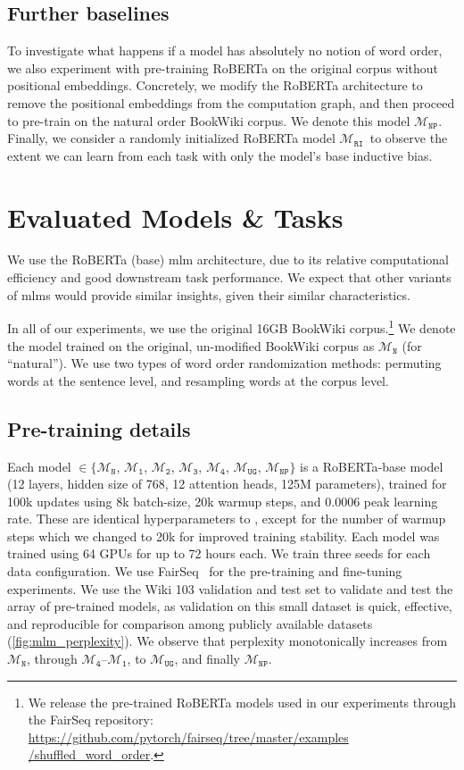 \documentclass[letterpaper, 12pt]{report}
\newcommand{\OR}{$\mathcal{M}_{\texttt{N}}$}
\newcommand{\RI}{$\mathcal{M}_{\texttt{1}}$}
\newcommand{\RII}{$\mathcal{M}_{\texttt{2}}$}
\newcommand{\RIII}{$\mathcal{M}_{\texttt{3}}$}
\newcommand{\RIV}{$\mathcal{M}_{\texttt{4}}$}
\newcommand{\RC}{$\mathcal{M}_{\texttt{UG}}$}
\newcommand{\RT}{$\mathcal{M}_{\texttt{RI}}$}
\newcommand{\NP}{$\mathcal{M}_{\texttt{NP}}$}
\begin{document}
\subsection{Further baselines}

To investigate what happens if a model has absolutely no notion of word order, we also experiment with pre-training RoBERTa on the original corpus without positional embeddings.
Concretely, we modify the RoBERTa architecture to remove the positional embeddings from the computation graph, and then proceed to pre-train on the natural order BookWiki corpus.
We denote this model \NP.
Finally, we consider a randomly initialized RoBERTa model \RT\, to observe the extent we can learn from each task with only the model's base inductive bias.

\section{Evaluated Models \& Tasks}
\label{sec:mlm_evaluated_models}

We use the RoBERTa (base) \citep{liu-et-al-2019-roberta} \acrshort{mlm} architecture, due to its relative computational efficiency and good downstream task performance. We expect that other variants of \acrshort{mlm}s would provide similar insights, given their similar characteristics.

In all of our experiments, we use the original 16GB BookWiki corpus.\footnote{We release the pre-trained RoBERTa models used in our experiments through the FairSeq repository:  \href{https://github.com/pytorch/fairseq/tree/master/examples/shuffled_word_order}{https://github.com/pytorch/fairseq/tree/master/examples /shuffled\_word\_order}.} We denote the model trained on the original, un-modified BookWiki corpus as \OR{} (for ``natural''). We use two types of word order randomization methods: permuting words at the sentence level, and resampling words at the corpus level.


\subsection{Pre-training details}

Each model $\in \{$\OR, \RI, \RII, \RIII, \RIV, \RC, \NP$\}$ is a RoBERTa-base model (12 layers, hidden size of 768, 12 attention heads, 125M parameters), trained for 100k updates using 8k batch-size, 20k warmup steps, and 0.0006 peak learning rate. These are identical hyperparameters to \cite{liu-et-al-2019-roberta}, except for the number of warmup steps which we changed to 20k for improved training stability. Each model was trained using 64 GPUs for up to 72 hours each. We train three seeds for each data configuration. We use FairSeq~\citep{ott2019fairseq} for the pre-training and fine-tuning experiments.
We use the Wiki 103 validation and test set to validate and test the array of pre-trained models, as validation on this small dataset is quick, effective, and reproducible for comparison among publicly available datasets (\autoref{fig:mlm_perplexity}). We observe that perplexity monotonically increases from \OR, through \RIV--\RI, to \RC, and finally \NP.
\end{document}
